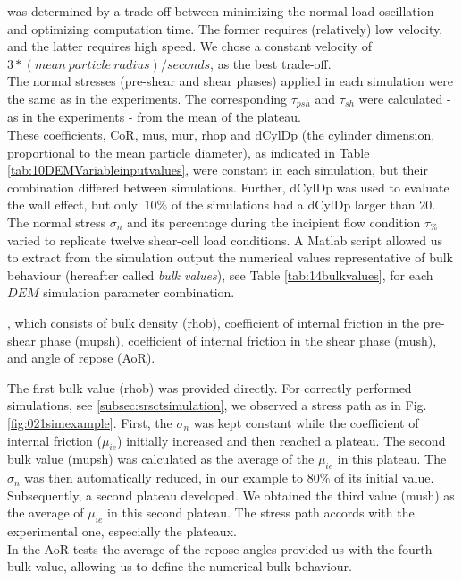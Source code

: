 was determined by a trade-off between minimizing the normal load oscillation and
optimizing computation time. 
The former requires (relatively) low velocity, and the latter requires high
speed.
We chose a constant velocity of $3*(mean ~ particle ~ radius)/seconds$, as the
best trade-off.\\
The normal stresses (pre-shear and shear phases) applied in each simulation were
the same as in the experiments.
The corresponding $\tau_{psh}$ and $\tau_{sh}$ were calculated - as in the experiments - from the mean of the plateau.\\
These coefficients, \ac{CoR}, \ac{mus}, \ac{mur},
\ac{rhop} and \ac{dCylDp} (the cylinder dimension, proportional to the mean
particle diameter), as indicated in Table \ref{tab:10DEMVariableinputvalues}, 
were constant in each simulation, but their combination differed between
simulations.
Further, \ac{dCylDp} was used to evaluate the wall effect, but only $~10\%$ of the
simulations had a \ac{dCylDp} larger than $20$.
The normal stress $\sigma_n$ and its
percentage during the incipient flow condition $\tau_{\%}$
varied to replicate twelve shear-cell load conditions. 
A Matlab script allowed us to extract from the simulation output the numerical
values representative of bulk behaviour (hereafter called \textit{bulk values}),
see Table \ref{tab:14bulkvalues},
for each $DEM$ simulation parameter combination.

, which consists of
 bulk density (\ac{rhob}),
 coefficient of internal friction in the pre-shear phase (\ac{mupsh}),
 coefficient of internal friction in the shear phase (\ac{mush}),
 and angle of repose (\ac{AoR}).
 
 
The first bulk value (\ac{rhob}) was provided directly. 
For correctly performed simulations, see \ref{subsec:srsctsimulation}, we
observed a stress path as in Fig. \ref{fig:021simexample}.
First, the $\sigma_n$ was kept constant while the coefficient of internal
friction ($\mu_{ie}$) initially increased and then reached a plateau.
The second bulk value (\ac{mupsh}) was calculated as the average of the
$\mu_{ie}$ in this plateau.
The $\sigma_n$ was then automatically reduced, in our example to $80 \%$ of
its initial value.
Subsequently, a second plateau developed.
We obtained the third
value (\ac{mush}) as the average of $\mu_{ie}$ in this second plateau.
The stress path accords with the experimental one, especially the plateaux.\\
In the \ac{AoR} tests the average of the repose angles provided us with the fourth
bulk value, allowing us to define the numerical bulk behaviour.

